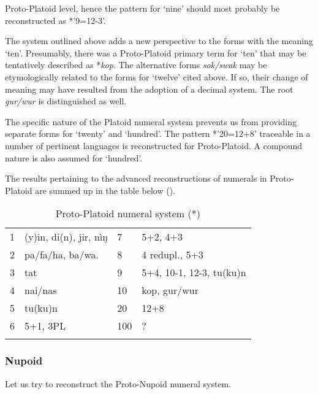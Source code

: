 Proto-Platoid level, hence the pattern for ‘nine’ should most probably be reconstructed as *’9=12-3’. 

The system outlined above adds a new perspective to the forms with the meaning ‘ten’. Presumably, there was a Proto-Platoid primary term for ‘ten’ that may be tentatively described as *\textit{kop}. The alternative forms \textit{sok/swak} may be etymologically related to the forms for ‘twelve’ cited above. If so, their change of meaning may have resulted from the adoption of a decimal system. The root \textit{gur/wur} is distinguished as well.

The specific nature of the Platoid numeral system prevents us from providing separate forms for ‘twenty’ and ‘hundred’. The pattern *’20=12+8’ traceable in a number of pertinent languages is reconstructed for Proto-Platoid. A compound nature is also assumed for ‘hundred’.

The results pertaining to the advanced reconstructions of numerals in Proto-Platoid are summed up in the table below ().

\begin{table}
\caption{\label{tab:3:47}Proto-Platoid numeral system (*)}
\begin{tabularx}{\textwidth}{lXlX}
\lsptoprule
{1} & (y)in, di(n), jir, nìŋ & {7} & 5+2, 4+3\\
{2} & pa/fa/ha, ba/wa. & {8} & 4 redupl., 5+3\\
{3} & tat & {9} & 5+4, 10-1, 12-3, tu(ku)n\\
{4} & nai/nas & {10} & kop, gur/wur\\
{5} & tu(ku)n & {20} & 12+8\\
{6} & 5+1, 3PL & {100} & ?\\
\lspbottomrule
\end{tabularx}
\end{table}

\newpage  
\subsubsection{Nupoid}\label{sec:3.1.2.9}
Let us try to reconstruct the Proto-Nupoid numeral system.

